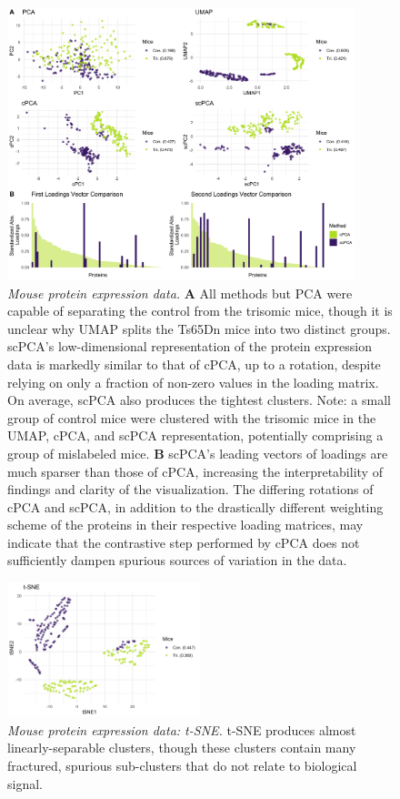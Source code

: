 \documentclass{article}
\begin{document}
\begin{figure}[!htbp]
  \centering
  \includegraphics[width=0.9\textwidth]{figures/mice_results}
  \caption{{\em Mouse protein expression data.} \textbf{A} All methods but PCA were capable of separating the control from the trisomic mice, though it is unclear why UMAP splits the Ts65Dn mice into two distinct groups. scPCA's low-dimensional representation of the protein expression data is markedly similar to that of cPCA, up to a rotation, despite relying on only a fraction of non-zero values in the loading matrix. On average, scPCA also produces the tightest clusters. Note: a small group of control mice were clustered with the trisomic mice in the UMAP, cPCA, and scPCA representation, potentially comprising a group of mislabeled mice. \textbf{B} scPCA's leading vectors of loadings are much sparser than those of cPCA, increasing the interpretability of findings and clarity of the visualization. The differing rotations of cPCA and scPCA, in addition to the drastically different weighting scheme of the proteins in their respective loading matrices, may indicate that the contrastive step performed by cPCA does not sufficiently dampen spurious sources of variation in the data.}
  \label{fig:comp_mice}
\end{figure}

\begin{figure}[!htbp]
    \centering
    \includegraphics[width=0.5\textwidth]{figures/mice_tsne}
    \caption{
    \textit{Mouse protein expression data: t-SNE.}
    t-SNE produces almost linearly-separable clusters, though these clusters contain many fractured, spurious sub-clusters that do not relate to biological signal.
    }
    \label{fig:mice_tsne}
\end{figure}
\end{document}
